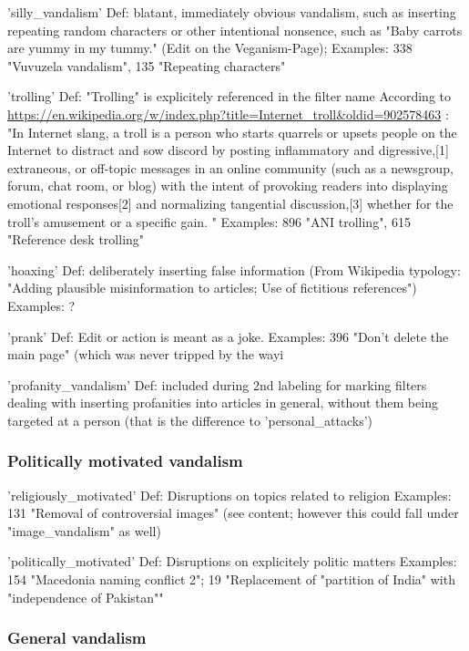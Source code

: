 'silly\_vandalism'
  Def: blatant, immediately obvious vandalism, such as inserting repeating random characters or other intentional nonsence, such as "Baby carrots are yummy in my tummy." (Edit on the Veganism-Page);
  Examples: 338 "Vuvuzela vandalism", 135 "Repeating characters"

'trolling'
  Def: "Trolling" is explicitely referenced in the filter name
  According to \url{https://en.wikipedia.org/w/index.php?title=Internet_troll&oldid=902578463} :
  "In Internet slang, a troll is a person who starts quarrels or upsets people on the Internet to distract and sow discord by posting inflammatory and digressive,[1] extraneous, or off-topic messages in an online community (such as a newsgroup, forum, chat room, or blog) with the intent of provoking readers into displaying emotional responses[2] and normalizing tangential discussion,[3] whether for the troll's amusement or a specific gain. "
  Examples: 896 "ANI trolling", 615 "Reference desk trolling"

'hoaxing'
  Def: deliberately inserting false information (From Wikipedia typology: "Adding plausible misinformation to articles; Use of fictitious references")
  Examples: ?

'prank'
  Def: Edit or action is meant as a joke. %
  Examples: 396 "Don't delete the main page" (which was never tripped by the way^^)

'profanity\_vandalism'
  Def: included during 2nd labeling for marking filters dealing with inserting profanities into articles in general, without them being targeted at a person (that is the difference to 'personal\_attacks')


\subsubsection{Politically motivated vandalism}
'religiously\_motivated'
Def: Disruptions on topics related to religion
Examples: 131 "Removal of controversial images" (see content; however this could fall under "image\_vandalism" as well)

'politically\_motivated'
Def: Disruptions on explicitely politic matters
Examples: 154 "Macedonia naming conflict 2"; 19 "Replacement of "partition of India" with "independence of Pakistan""

\subsubsection{General vandalism}

